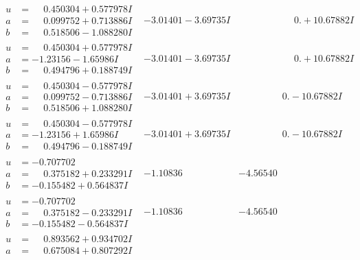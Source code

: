 \documentclass[1p]{elsarticle_modified}
\theoremstyle{definition}
\begin{document}
$$\begin{array}{c|c|c}
\begin{aligned}
u &= \phantom{-}0.450304 + 0.577978 I \\
a &= \phantom{-}0.099752 + 0.713886 I \\
b &= \phantom{-}0.518506 - 1.088280 I\end{aligned}
 & -3.01401 - 3.69735 I & \phantom{-0.000000 -}0. + 10.67882 I \\ \hline\begin{aligned}
u &= \phantom{-}0.450304 + 0.577978 I \\
a &= -1.23156 - 1.65986 I \\
b &= \phantom{-}0.494796 + 0.188749 I\end{aligned}
 & -3.01401 - 3.69735 I & \phantom{-0.000000 -}0. + 10.67882 I \\ \hline\begin{aligned}
u &= \phantom{-}0.450304 - 0.577978 I \\
a &= \phantom{-}0.099752 - 0.713886 I \\
b &= \phantom{-}0.518506 + 1.088280 I\end{aligned}
 & -3.01401 + 3.69735 I & \phantom{-0.000000 } 0. - 10.67882 I \\ \hline\begin{aligned}
u &= \phantom{-}0.450304 - 0.577978 I \\
a &= -1.23156 + 1.65986 I \\
b &= \phantom{-}0.494796 - 0.188749 I\end{aligned}
 & -3.01401 + 3.69735 I & \phantom{-0.000000 } 0. - 10.67882 I \\ \hline\begin{aligned}
u &= -0.707702\phantom{ +0.000000I} \\
a &= \phantom{-}0.375182 + 0.233291 I \\
b &= -0.155482 + 0.564837 I\end{aligned}
 & -1.10836\phantom{ +0.000000I} & -4.56540\phantom{ +0.000000I} \\ \hline\begin{aligned}
u &= -0.707702\phantom{ +0.000000I} \\
a &= \phantom{-}0.375182 - 0.233291 I \\
b &= -0.155482 - 0.564837 I\end{aligned}
 & -1.10836\phantom{ +0.000000I} & -4.56540\phantom{ +0.000000I} \\ \hline\begin{aligned}
u &= \phantom{-}0.893562 + 0.934702 I \\
a &= \phantom{-}0.675084 + 0.807292 I \\

\end{aligned}
\end{array}$$
\end{document}

